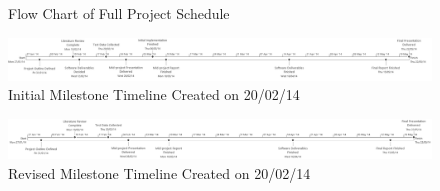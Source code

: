 \begin{figure}[h]
	\centering
	\caption{Flow Chart of Full Project Schedule}
	\label{fig:full-project-process}
\end{figure}

\begin{landscape}	
	\begin{figure}
		\centering
		\centerline{ \includegraphics[scale=0.475]{figures/schedule/initial_schedule_timeline.pdf} }
		\caption{Initial Milestone Timeline Created on 20/02/14}
		\label{fig:initial-milestone-timeline}
	\end{figure}

	\begin{figure}
		\centering
		\centerline{ \includegraphics[scale=0.475]{figures/schedule/revised_schedule_timeline.pdf} }
		\caption{Revised Milestone Timeline Created on 20/02/14}
		\label{fig:revised-milestone-timeline}
	\end{figure}	
\end{landscape}




